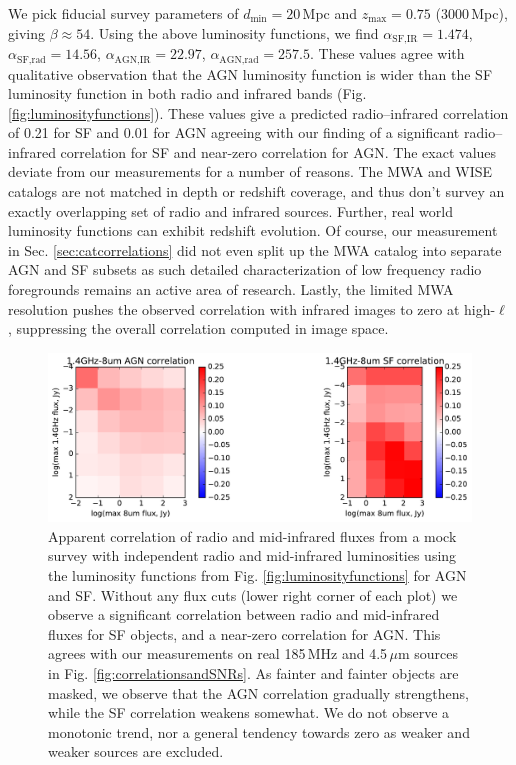 \documentclass[numberedappendix]{emulateapj}
\newcommand{\mintext}{\text{min}}
\newcommand{\maxtext}{\text{max}}
\begin{document}
We pick fiducial survey parameters of $d_\mintext=20$\,Mpc and $z_\maxtext=0.75$ (3000\,Mpc), giving $\beta\approx54$.  Using the above luminosity functions, we find $\alpha_{\text{SF,IR}}=1.474$, $\alpha_{\text{SF,rad}}=14.56$, $\alpha_{\text{AGN,IR}}=22.97$, $\alpha_{\text{AGN,rad}}=257.5$. These values agree with qualitative observation that the AGN luminosity function is wider than the SF luminosity function in both radio and infrared bands (Fig. \ref{fig:luminosityfunctions}). These values give a predicted radio--infrared correlation of 0.21 for SF and 0.01 for AGN agreeing with our finding of a significant radio--infrared correlation for SF and near-zero correlation for AGN. The exact values deviate from our measurements for a number of reasons. The MWA and WISE catalogs are not matched in depth or redshift coverage, and thus don't survey an exactly overlapping set of radio and infrared sources. Further, real world luminosity functions can exhibit redshift evolution. Of course, our measurement in Sec. \ref{sec:catcorrelations} did not even split up the MWA catalog into separate AGN and SF subsets as such detailed characterization of low frequency radio foregrounds remains an active area of research. Lastly, the limited MWA resolution pushes the observed correlation with infrared images to zero at high-$\ell$, suppressing the overall correlation computed in image space.

\begin{figure}[h]
\centering
\includegraphics[width=6in]{chap5_xcor/sim_correlation_agn_and_sf.pdf}
\caption{Apparent correlation of radio and mid-infrared fluxes from a mock survey with independent radio and mid-infrared luminosities using the luminosity functions from Fig. \ref{fig:luminosityfunctions} for AGN and SF. Without any flux cuts (lower right corner of each plot) we observe a significant correlation between radio and mid-infrared fluxes for SF objects, and a near-zero correlation for AGN. This agrees with our measurements on real 185\,MHz and 4.5\,$\mu$m sources in Fig. \ref{fig:correlationsandSNRs}. As fainter and fainter objects are masked, we observe that the AGN correlation gradually strengthens, while the SF correlation weakens somewhat. We do not observe a monotonic trend, nor a general tendency towards zero as weaker and weaker sources are excluded. }
\label{fig:simagnlfcorrelations}
\end{figure}
\end{document}
